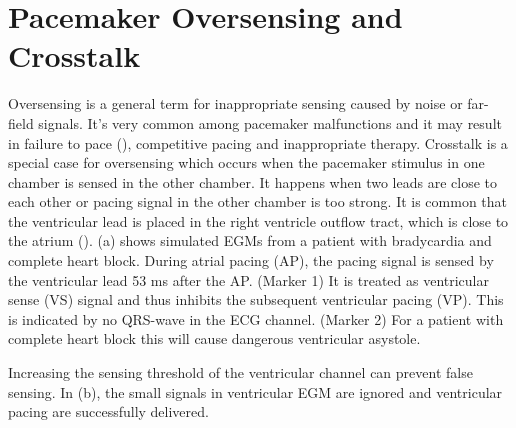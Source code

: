\section{Pacemaker Oversensing and Crosstalk}
Oversensing is a general term for inappropriate sensing caused by noise or far-field signals. It's very common among pacemaker malfunctions and it may result in failure to pace (\cite{med2, leads}), competitive pacing and inappropriate therapy. Crosstalk is a special case for oversensing which occurs when the pacemaker stimulus in one chamber is sensed in the other chamber. It happens when two leads are close to each other or pacing signal in the other chamber is too strong. It is common that the ventricular lead is placed in the right ventricle outflow tract, which is close to the atrium (\cite{icd}). (a) shows simulated EGMs from a patient with bradycardia and complete heart block. During atrial pacing (AP), the pacing signal is sensed by the ventricular lead 53 ms after the AP. (Marker 1) It is treated as ventricular sense (VS) signal and thus inhibits the subsequent ventricular pacing (VP). This is indicated by no QRS-wave in the ECG channel. (Marker 2) For a patient with complete heart block this will cause dangerous ventricular asystole.  

Increasing the sensing threshold of the ventricular channel can prevent false sensing. In (b), the small signals in ventricular EGM are ignored and ventricular pacing are successfully delivered. 



